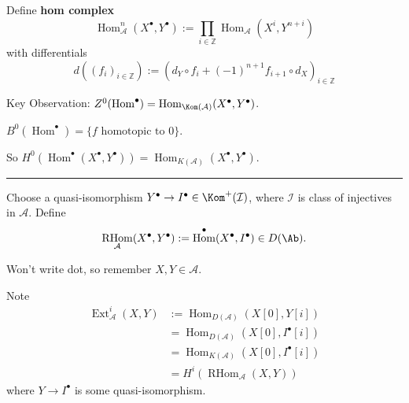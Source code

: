 \documentclass[12pt]{article}
\newcommand{\keyword}[1]{\textbf{#1}}
\newcommand{\sepline}{\rule{\textwidth}{0.4pt}}
\theoremstyle{definition}
\newcommand{\Z}{\mathbb{Z}}
\renewcommand{\AA}{\mathcal{A}}
\newcommand{\<}{\left\langle}
\renewcommand{\>}{\right\rangle}
\DeclareMathOperator{\Hom}{Hom}
\DeclareMathOperator{\RHom}{RHom}
\DeclareMathOperator{\Ext}{Ext}
\renewcommand{\_}[1]{{_{#1}}}
\begin{document}
Define \keyword{hom complex}
\[
    \Hom_\AA^n(X^\bullet, Y^\bullet) := \prod_{i \in \Z} \Hom_\AA(X^i, Y^{n+i})
\]
with differentials
\[
    d((f_i)_{i \in \Z}) := (d_Y \circ f_i + (-1)^{n+1} f_{i+1} \circ d_X)_{i \in \Z}
\]

Key Observation: $Z^0(\Hom^\bullet) = \Hom_{\Kom(\AA)}(X^\bullet, Y^\bullet)$.

$B^0(\Hom^\bullet) = \{f \text{ homotopic to } 0\}$.

So $H^0(\Hom^\bullet(X^\bullet, Y^\bullet)) = \Hom_{K(\AA)}(X^\bullet, Y^\bullet)$.

\sepline

Choose a quasi-isomorphism $Y^\bullet \to I^\bullet \in \Kom^+(\mathcal{I})$, where $\mathcal{I}$ is class of injectives in $\AA$.
Define
\[
    \RHom_\AA(X^\bullet, Y^\bullet) := \Hom^\bullet(X^\bullet, I^\bullet) \in D(\Ab).
\]

Won't write dot, so remember $X, Y \in \AA$.

Note
\begin{align*}
    \Ext_\AA^i(X, Y) 
        &:= \Hom_{D(\AA)}(X[0], Y[i]) \\
        &= \Hom_{D(\AA)}(X[0], I^\bullet[i]) \\
        &= \Hom_{K(\AA)}(X[0], I^\bullet[i]) \\
        &= H^i(\RHom_\AA(X, Y))
\end{align*}
where $Y \to I^\bullet$ is some quasi-isomorphism.
\end{document}
